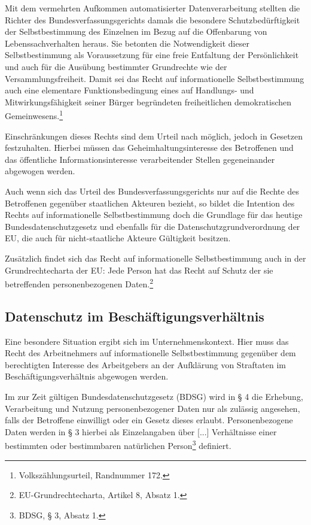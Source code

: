 Mit dem vermehrten Aufkommen automatisierter Datenverarbeitung stellten die Richter des Bundesverfassungsgerichts damals die besondere Schutzbedürftigkeit der Selbstbestimmung des Einzelnen im Bezug auf die Offenbarung von Lebenssachverhalten heraus. Sie betonten die Notwendigkeit dieser Selbstbestimmung als Voraussetzung für eine freie Entfaltung der Persönlichkeit und auch für die Ausübung bestimmter Grundrechte wie der Versammlungsfreiheit. Damit sei das Recht auf informationelle Selbstbestimmung auch \glqq eine elementare Funktionsbedingung eines auf Handlungs- und Mitwirkungsfähigkeit seiner Bürger begründeten freiheitlichen demokratischen Gemeinwesens\grqq{}.\footnote{
  Volkszählungsurteil, Randnummer 172.
}
    
Einschränkungen dieses Rechts sind dem Urteil nach möglich, jedoch in Gesetzen festzuhalten. Hierbei müssen das Geheimhaltungsinteresse des Betroffenen und das öffentliche Informationsinteresse verarbeitender Stellen gegeneinander abgewogen werden.

Auch wenn sich das Urteil des Bundesverfassungsgerichts nur auf die Rechte des Betroffenen gegenüber staatlichen Akteuren bezieht, so bildet die Intention des Rechts auf informationelle Selbstbestimmung doch die Grundlage für das heutige Bundesdatenschutzgesetz und ebenfalls für die Datenschutzgrundverordnung der EU, die auch für nicht-staatliche Akteure Gültigkeit besitzen.

Zusätzlich findet sich das Recht auf informationelle Selbstbestimmung auch in der Grundrechtecharta der EU: \glqq Jede Person hat das Recht auf Schutz der sie betreffenden personenbezogenen Daten\grqq{}.\footnote{
  EU-Grundrechtecharta, Artikel 8, Absatz 1.
}

\subsection{Datenschutz im Beschäftigungsverhältnis}

Eine besondere Situation ergibt sich im Unternehmenskontext. Hier muss das Recht des Arbeitnehmers auf informationelle Selbstbestimmung gegenüber dem berechtigten Interesse des Arbeitgebers an der Aufklärung von Straftaten im Beschäftigungsverhältnis abgewogen werden. 

Im zur Zeit gültigen Bundesdatenschutzgesetz (BDSG) wird in § 4 die Erhebung, Verarbeitung und Nutzung personenbezogener Daten nur als zulässig angesehen, falls der Betroffene einwilligt oder ein Gesetz dieses erlaubt. Personenbezogene Daten werden in § 3 hierbei als \glqq Einzelangaben über [...] Verhältnisse einer bestimmten oder bestimmbaren natürlichen Person\grqq{}\footnote{
  BDSG, § 3, Absatz 1.
} definiert.

